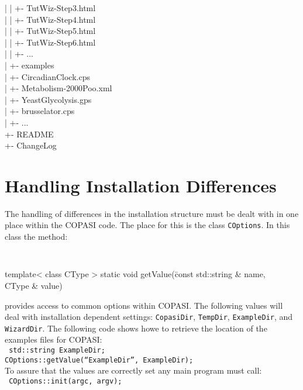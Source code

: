\documentclass[12pt]{book}
\begin{document}
{\begin{tabbing}
 \> | \> \> | \> \> +- TutWiz-Step3.html \\
 \> | \> \> | \> \> +- TutWiz-Step4.html \\
 \> | \> \> | \> \> +- TutWiz-Step5.html \\
 \> | \> \> | \> \> +- TutWiz-Step6.html \\
 \> | \> \> | \> \> +- ... \\
 \> | \> \> +- examples \\
 \> | \> \> \> +- CircadianClock.cps \\
 \> | \> \> \> +- Metabolism-2000Poo.xml \\
 \> | \> \> \> +- YeastGlycolysis.gps \\
 \> | \> \> \> +- brusselator.cps \\
 \> | \> \> \> +- ... \\
 \> +- README \\
 \> +- ChangeLog \\
\end{tabbing}
}

\section{Handling Installation Differences}
The handling of differences in the installation structure must be
dealt with in one place within the COPASI code. The place for this is
the class {\tt COptions}. In this class the method:
{\tt \scriptsize
\begin{tabbing}
template< class CType > static void getValue(\=const std::string \&
name, \\
\> CType \& value)
\end{tabbing}
}
\noindent
provides access to common options within COPASI. The following values
will deal with installation dependent settings:
{\tt CopasiDir}, {\tt TempDir}, {\tt ExampleDir}, and {\tt WizardDir}. The following code
shows howe to retrieve the location of the examples files for COPASI: \\
{\tt \scriptsize
\indent std::string ExampleDir; \\[-4 pt]
\indent COptions::getValue(``ExampleDir'', ExampleDir); \\
}
\noindent
To assure that the values are correctly set any main program must
call: \\
{\tt \scriptsize
\indent       COptions::init(argc, argv);
}
\end{document}

